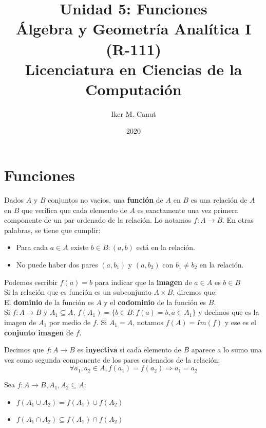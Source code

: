 \documentclass[11pt,a4paper]{article}
\author{Iker M. Canut}
\title{Unidad 5: Funciones\\\'Algebra y Geometr\'ia Anal\'itica I (R-111)\\Licenciatura en Ciencias de la Computaci\'on}
\date{2020}
\begin{document}
\maketitle
\newpage

\section{Funciones}
Dados $A$ y $B$ conjuntos no vacios, una \textbf{funci\'on} de $A$ en $B$ es una relaci\'on de $A$ en $B$ que verifica que cada elemento de $A$ es exactamente una vez primera componente de un par ordenado de la relaci\'on. Lo notamos $f : A \rightarrow B$. En otras palabras, se tiene que cumplir:
\begin{itemize}
\item Para cada $a \in A$ existe $b \in B : (a,b)$ est\'a en la relaci\'on.
\item No puede haber dos pares $(a, b_1)$ y $(a,b_2)$ con $b_1 \not = b_2$ en la relaci\'on.
\end{itemize}
Podemos escribir $f(a) = b$ para indicar que la \textbf{imagen} de $a\in A$ es $b\in B$\\

\noindent Si la relaci\'on que es funci\'on es un subconjunto $A\times B$, diremos que:\\
\indent El \textbf{dominio} de la funci\'on es $A$ y el \textbf{codominio} de la funci\'on es $B$.\\

Si $f : A \rightarrow B$ y $A_1 \subseteq A$,
$f(A_1) = \{ b \in B : f(a) = b, a \in A_1 \}$
y decimos que es la imagen de $A_1$ por medio de $f$. Si $A_1 = A$, notamos $f(A) = Im(f)$ y ese es el \textbf{conjunto imagen} de $f$.

\noindent \dotfill

Decimos que $f : A \rightarrow B$ es \textbf{inyectiva} si cada elemento de $B$ aparece a lo sumo una vez como segunda componente de los pares ordenados de la relaci\'on: $$\forall a_1, a_2 \in A, f(a_1) = f(a_2) \Rightarrow a_1 = a_2$$
\noindent \dotfill

Sea $f:A\rightarrow B, A_1, A_2 \subseteq A$:
\begin{multicols}{2}
\begin{itemize}
\item $f(A_1 \cup A_2) = f(A_1) \cup f(A_2)$
\item $f(A_1 \cap A_2) \subseteq f(A_1) \cap f(A_2)$
\end{itemize}
\end{multicols}
\noindent \dotfill
\end{document}
